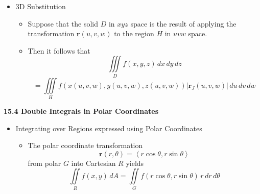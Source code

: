 \documentclass[12pt]{article}
\renewcommand{\vec}[1]{\mathbf{#1}}
\newcommand{\dvar}[1]{\,d{#1}}
\newcommand{\<}{\left<}
\renewcommand{\>}{\right>}
\begin{document}
\begin{itemize}
  \newpage
    
  \item 3D Substitution
  
    \begin{itemize}
    \item Suppose that the solid $D$ in $xyz$ space is the result of applying the transformation $\vec{r}(u,v,w)$ to the region $H$ in $uvw$ space.
    \item Then it follows that \[\iiint\limits_D f(x,y,z)\,dx\,dy\,dz \]\[= \iiint\limits_H f(x(u,v,w),y(u,v,w),z(u,v,w))|\vec{r}_J(u,v,w)|\,du\,dv\,dw\]
    \end{itemize}
        
  
    
  \end{itemize}
  
\newpage

\centerline{\bf 15.4 Double Integrals in Polar Coordinates}
  
  \begin{itemize}
  
  \item Integrating over Regions expressed using Polar Coordinates
    
    \begin{itemize}
    \item The polar coordinate transformation \[\vec{r}(r,\theta) = \<r\cos\theta, r\sin\theta\>\] from polar $G$ into Cartesian $R$ yields \[\iint\limits_R f(x,y)\, dA = \iint\limits_G f(r\cos\theta,r\sin\theta)\,r\dvar{r}\dvar{\theta}\]
    \end{itemize}
      
  
    
  \end{itemize}
  
\end{document}
